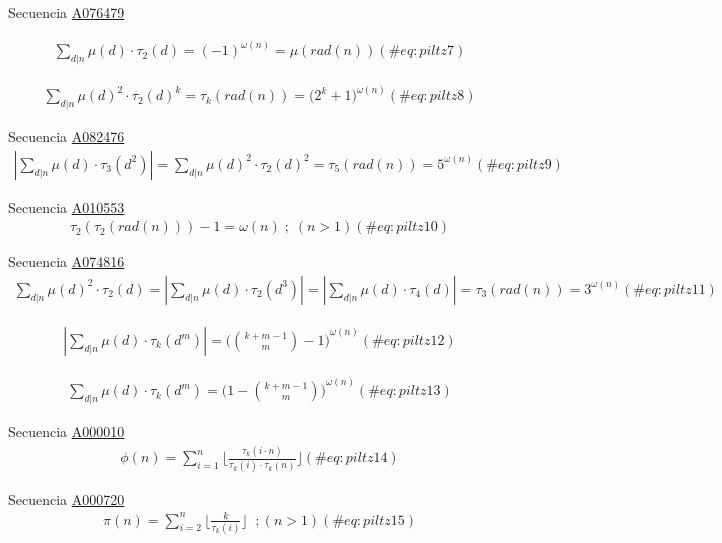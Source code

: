 \documentclass[
  letterpaper,
  DIV=11,
  numbers=noendperiod]{scrreprt}
\begin{document}
Secuencia \href{https://oeis.org/A076479}{A076479}

\begin{multline}
\sum_{d|n}{\mu(d)\cdot\tau_{2}(d)}=
(-1)^{\omega(n)}=\mu(rad(n))
(\#eq:piltz7)
\end{multline}

\begin{multline}
\sum_{d|n}{{\mu(d)}^{2}\cdot{\tau_{2}(d)}^{k}}=
\tau_k(rad(n))=\bigg({2^{k}+1}\bigg)^{\omega(n)}
(\#eq:piltz8)
\end{multline}

Secuencia \href{https://oeis.org/A082476}{A082476} \begin{multline}
|\sum_{d|n}{\mu(d)\cdot\tau_{3}(d^{2})}|= \sum_{d|n}{{\mu(d)}^{2}\cdot{\tau_{2}(d)}^{2}}=
\tau_{5}(rad(n))=5^{\omega(n)}
(\#eq:piltz9)
\end{multline}

Secuencia \href{https://oeis.org/A010553}{A010553} \begin{multline}
\tau_{2}(\tau_{2}(rad(n)))-1=\omega(n) \; ; \; (n > 1)
(\#eq:piltz10)
\end{multline}

Secuencia \href{https://oeis.org/A074816}{A074816} \begin{multline}
\sum_{d|n}{ \mu(d)^{2} \cdot \tau_{2}(d) } =
|\sum_{d|n}{ \mu(d) \cdot \tau_{2}(d^3) }| =
|\sum_{d|n}{ \mu(d) \cdot \tau_{4}(d) }| =
\tau_{3}(rad(n)) =
3^{\omega(n)}
(\#eq:piltz11)
\end{multline}

\begin{multline}
|\sum_{d|n}{\mu(d)\cdot\tau_{k}(d^{m})}|=
{\bigg(\binom{k+m-1}{m}-1 \bigg)}^{\omega(n)}
(\#eq:piltz12)
\end{multline}

\begin{multline}
\sum_{d|n}{\mu(d)\cdot\tau_{k}(d^{m})}=
{\bigg(1-\binom{k+m-1}{m}\bigg) }^{\omega(n)}
(\#eq:piltz13)
\end{multline}

Secuencia \href{https://oeis.org/A000010}{A000010} \begin{multline}
\phi(n)=\sum_{i=1}^{n}{\bigg\lfloor \frac{\tau_{k}(i\cdot n)}{\tau_{k}(i)\cdot \tau_{k}(n)} \bigg\rfloor}
(\#eq:piltz14)
\end{multline}

Secuencia \href{https://oeis.org/A000720}{A000720} \begin{multline}
\pi(n)=
\sum_{i=2}^{n}{\bigg\lfloor \frac{k}{\tau_{k}(i)}\bigg\rfloor}
\;\; ;(n>1)
(\#eq:piltz15)
\end{multline}
\end{document}

